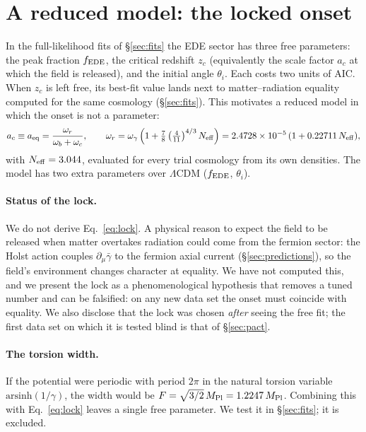 \documentclass[11pt]{article}
\newcommand{\Mp}{M_{\rm Pl}}
\begin{document}
\section{A reduced model: the locked onset}\label{sec:lock}
In the full-likelihood fits of \S\ref{sec:fits} the EDE sector has three free parameters:
the peak fraction $f_{\rm EDE}$, the critical redshift $z_c$ (equivalently the scale factor
$a_c$ at which the field is released), and the initial angle $\theta_i$. Each costs two
units of AIC. When $z_c$ is left free, its best-fit value lands next to matter--radiation
equality computed for the same cosmology (\S\ref{sec:fits}). This motivates a reduced model
in which the onset is not a parameter:
\begin{equation}
a_c\equiv a_{\rm eq}=\frac{\omega_r}{\omega_b+\omega_c},\qquad
\omega_r=\omega_\gamma\left(1+\tfrac{7}{8}\left(\tfrac{4}{11}\right)^{4/3}N_{\rm eff}\right)
=2.4728\times10^{-5}\,(1+0.22711\,N_{\rm eff}),
\label{eq:lock}
\end{equation}
with $N_{\rm eff}=3.044$, evaluated for every trial cosmology from its own densities. The
model has two extra parameters over $\Lambda$CDM ($f_{\rm EDE}$, $\theta_i$).

\paragraph{Status of the lock.} We do not derive Eq.~\eqref{eq:lock}. A physical reason to
expect the field to be released when matter overtakes radiation could come from the fermion
sector: the Holst action couples $\partial_\mu\bar\gamma$ to the fermion axial current
(\S\ref{sec:predictions}), so the field's environment changes character at equality. We
have not computed this, and we present the lock as a phenomenological hypothesis that
removes a tuned number and can be falsified: on any new data set the onset must coincide
with equality. We also disclose that the lock was chosen \emph{after} seeing the free fit;
the first data set on which it is tested blind is that of \S\ref{sec:pact}.

\paragraph{The torsion width.} If the potential were periodic with period $2\pi$ in the
natural torsion variable $\mathrm{arsinh}(1/\gamma)$, the width would be
$F=\sqrt{3/2}\,\Mp=1.2247\,\Mp$. Combining this with Eq.~\eqref{eq:lock} leaves a single
free parameter. We test it in \S\ref{sec:fits}; it is excluded.
\end{document}
